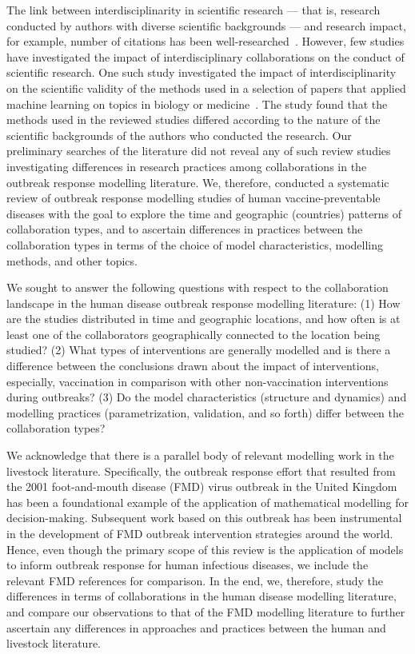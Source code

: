 \documentclass[10pt,letterpaper]{article}
\begin{document}
The link between interdisciplinarity in scientific research --- that is, research conducted by authors with diverse scientific backgrounds --- and research impact, for example, number of citations has been well-researched~\cite{Abramo2017,Wagner2011}. However, few studies have investigated the impact of interdisciplinary collaborations on the conduct of scientific research. One such study investigated the impact of interdisciplinarity on the scientific validity of the methods used in a selection of papers that applied machine learning on topics in biology or medicine~\cite{Littmann2020}. The study found that the methods used in the reviewed studies differed according to the nature of the scientific backgrounds of the authors who conducted the research. Our preliminary searches of the literature did not reveal any of such review studies investigating differences in research practices among collaborations in the outbreak response modelling literature. We, therefore, conducted a systematic review of outbreak response modelling studies of human vaccine-preventable diseases with the goal to explore the time and geographic (countries) patterns of collaboration types, and to ascertain differences in practices between the collaboration types in terms of the choice of model characteristics, modelling methods, and other topics. 

We sought to answer the following questions with respect to the collaboration landscape in the human disease outbreak response modelling literature: (1) How are the studies distributed in time and geographic locations, and how often is at least one of the collaborators geographically connected to the location being studied? (2) What types of interventions are generally modelled and is there a difference between the conclusions drawn about the impact of interventions, especially, vaccination in comparison with other non-vaccination interventions during outbreaks? (3) Do the model characteristics (structure and dynamics) and modelling practices (parametrization, validation, and so forth) differ between the collaboration types?    

We acknowledge that there is a parallel body of relevant modelling work in the livestock literature. Specifically, the outbreak response effort that resulted from the 2001 foot-and-mouth disease (FMD) virus outbreak in the United Kingdom has been a foundational example of the application of mathematical modelling for decision-making. Subsequent work based on this outbreak has been instrumental in the development of FMD outbreak intervention strategies around the world. Hence, even though the primary scope of this review is the application of models to inform outbreak response for human infectious diseases, we include the relevant FMD references for comparison. In the end, we, therefore, study the differences in terms of collaborations in the human disease modelling literature, and compare our observations to that of the FMD modelling literature to further ascertain any differences in approaches and practices between the human and livestock literature. 
\end{document}
